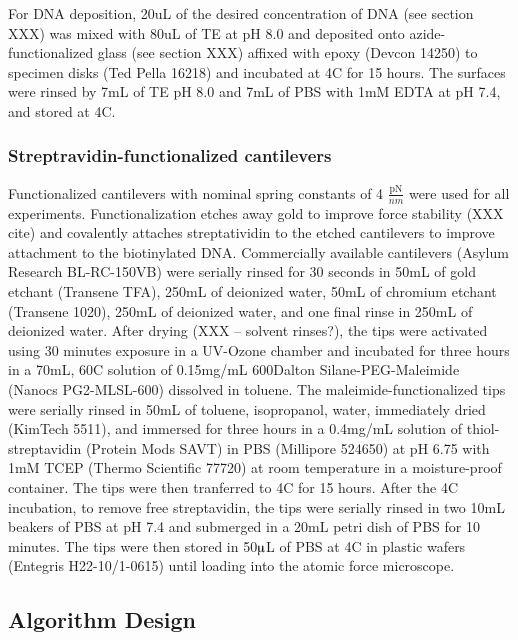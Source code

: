 \documentclass[%
  aip,12pt,tightenlines,
  amsthm,
 amsmath,amssymb
]{article}
\newcommand{\sLabel}[1]{\label{section:#1}}
\newcommand{\firstp}[0]{}
\newcommand{\pl}[0]{\vspace{6pt}}
\newcommand{\supply}[2]{(#1 #2)}
\newcommand{\degreeC}[0]{\degree{}C}
\begin{document}
For DNA deposition, 20uL of the desired concentration of DNA (see section XXX) was mixed with 80uL of TE at pH 8.0 and deposited onto azide-functionalized glass (see section XXX) affixed with epoxy \supply{Devcon}{14250} to specimen disks \supply{Ted Pella}{16218} and incubated at 4C for 15 hours. The surfaces were rinsed by 7mL of TE pH 8.0 and 7mL of PBS with 1mM EDTA at pH 7.4, and stored at 4\degreeC{}. 

\subsubsection{\sLabel{Cantilevers}Streptravidin-functionalized cantilevers}

\firstp Functionalized cantilevers with nominal spring constants of 4 $\frac{\text{pN}}{nm}$  were used for all experiments. Functionalization etches away gold to improve force stability (XXX cite) and covalently attaches streptatividin to the etched cantilevers to improve attachment to the biotinylated DNA. Commercially available cantilevers \supply{Asylum Research}{BL-RC-150VB} were serially rinsed for 30 seconds in 50mL of gold etchant \supply{Transene}{TFA}, 250mL of deionized water, 50mL of chromium etchant \supply{Transene}{1020}, 250mL of deionized water, and one final rinse in 250mL of deionized water. After drying (XXX -- solvent rinses?), the tips were activated using 30 minutes exposure in a UV-Ozone chamber and incubated for three hours in a 70mL, 60\degreeC{} solution of 0.15mg/mL 600Dalton Silane-PEG-Maleimide \supply{Nanocs}{PG2-MLSL-600} dissolved in toluene. The maleimide-functionalized tips were serially rinsed in 50mL of toluene, isopropanol, water, immediately dried \supply{KimTech}{5511}, and immersed for three hours in a 0.4mg/mL solution of thiol-streptavidin \supply{Protein Mods}{SAVT} in PBS \supply{Millipore}{524650} at pH 6.75 with 1mM TCEP \supply{Thermo Scientific}{77720} at room temperature in a moisture-proof container. The tips were then tranferred to 4\degreeC{} for 15 hours. After the 4\degreeC{} incubation, to remove free streptavidin, the tips were serially rinsed in two 10mL beakers of PBS at pH 7.4 and submerged in a 20mL petri dish of PBS for 10 minutes. The tips were then stored in 50$\muup$L of PBS at 4C in plastic wafers \supply{Entegris}{H22-10/1-0615} until loading into the atomic force microscope. \pl


\subsection{Algorithm Design}
\end{document}
